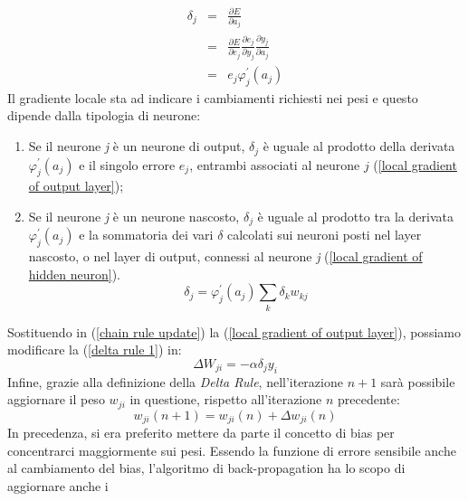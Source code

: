 \begin{eqnarray}\label{local gradient of output layer}
    \delta_j & = & \frac{\partial E}{\partial a_{j}} \nonumber \\
             & = & \frac{\partial E}{\partial e_{j}} \frac{\partial e_{j}}{\partial y_{j}} \frac{\partial y_{j}}{\partial a_{j}} \nonumber \\
             & = & e_j\varphi_j^{'}(a_j)
\end{eqnarray}
Il gradiente locale sta ad indicare i cambiamenti richiesti nei pesi e questo dipende 
dalla tipologia di neurone:
\begin{enumerate}
    \item Se il neurone \emph{j} è un neurone di output, $\delta_j$ è uguale al prodotto della derivata 
    $\varphi_j^{'}(a_j)$ e il singolo errore $e_{j}$, entrambi associati al neurone $j$ (\ref{local gradient of output layer});
    \item Se il neurone \emph{j} è un neurone nascosto, $\delta_j$ è uguale al prodotto tra la derivata 
    $\varphi_j^{'}(a_j)$ e la sommatoria dei vari $\delta$ calcolati sui neuroni posti nel layer nascosto, 
    o nel layer di output, connessi al neurone \emph{j} (\ref{local gradient of hidden neuron}).
    \begin{equation}\label{local gradient of hidden neuron}
        \delta_j = \varphi_j^{'}(a_j)\sum_{k}\delta_kw_{kj}
    \end{equation}
\end{enumerate}
Sostituendo in (\ref{chain rule update}) la (\ref{local gradient of output layer}), possiamo modificare la (\ref{delta rule 1}) in:
\begin{equation}\label{delta rule 2}
    \Delta{W_{ji}} = -\alpha \delta_jy_i 
\end{equation}
Infine, grazie alla definizione della \emph{Delta Rule}, nell'iterazione $n+1$ sarà possibile 
aggiornare il peso $w_{ji}$ in questione, rispetto all'iterazione $n$ precedente:
\begin{equation}\label{weight change}
    w_{ji}(n+1) = w_{ji}(n)+\Delta{w_{ji}(n)}
\end{equation}
In precedenza, si era preferito mettere da parte il concetto di bias per concentrarci 
maggiormente sui pesi. Essendo la funzione di errore sensibile anche al cambiamento 
del bias, l'algoritmo di back-propagation ha lo scopo di aggiornare anche i 
